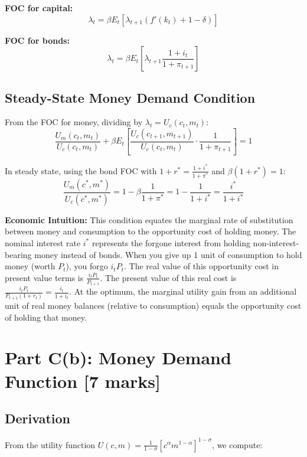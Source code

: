 \textbf{FOC for capital:}
\begin{equation}
\lambda_t = \beta E_t[\lambda_{t+1}(f'(k_t) + 1 - \delta)]
\end{equation}

\textbf{FOC for bonds:}
\begin{equation}
\lambda_t = \beta E_t\left[\lambda_{t+1}\frac{1+i_t}{1+\pi_{t+1}}\right]
\end{equation}

\subsection*{Steady-State Money Demand Condition}
From the FOC for money, dividing by $\lambda_t = U_c(c_t, m_t)$:
\begin{equation}
\frac{U_m(c_t, m_t)}{U_c(c_t, m_t)} + \beta E_t\left[\frac{U_c(c_{t+1}, m_{t+1})}{U_c(c_t, m_t)} \cdot \frac{1}{1+\pi_{t+1}}\right] = 1
\end{equation}

In steady state, using the bond FOC with $1+r^* = \frac{1+i^*}{1+\pi^*}$ and $\beta(1+r^*) = 1$:
\begin{equation}
\frac{U_m(c^*, m^*)}{U_c(c^*, m^*)} = 1 - \beta \frac{1}{1+\pi^*} = 1 - \frac{1}{1+i^*} = \frac{i^*}{1+i^*}
\end{equation}

\textbf{Economic Intuition:} This condition equates the marginal rate of substitution between money and consumption to the opportunity cost of holding money. The nominal interest rate $i^*$ represents the forgone interest from holding non-interest-bearing money instead of bonds. When you give up 1 unit of consumption to hold money (worth $P_t$),
you forgo $i_tP_t$. The real value of this opportunity cost in present value terms is $\frac{i_tP_t}{P_{t+1}}$. The present value of this real cost is $\frac{i_tP_t}{P_{t+1}(1+r_t)}=\frac{i_t}{1+i_t}$. At the optimum, the marginal utility gain from an additional unit of real money balances (relative to consumption) equals the opportunity cost of holding that money.


\section*{Part C(b): Money Demand Function [7 marks]}

\subsection*{Derivation}
From the utility function $U(c,m) = \frac{1}{1-\sigma}[c^\alpha m^{1-\alpha}]^{1-\sigma}$, we compute:

